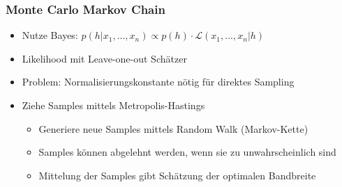 \begin{frame}
	\frametitle{Monte Carlo Markov Chain}
		
	\begin{itemize}
		\item Nutze Bayes: $p(h | x_1,...,x_n) \propto p(h) \cdot \mathcal{L}(x_1,...,x_n | h)$
		\item Likelihood mit Leave-one-out Sch\"atzer
		\item Problem: Normalisierungskonstante n\"otig f\"ur direktes Sampling
		\item Ziehe Samples mittels Metropolis-Hastings
		\begin{itemize}
			\item Generiere neue Samples mittels Random Walk (Markov-Kette)
			\item Samples k\"onnen abgelehnt werden, wenn sie zu unwahrscheinlich sind
			\item Mittelung der Samples gibt Sch\"atzung der optimalen Bandbreite
		\end{itemize}
	\end{itemize}
\end{frame}